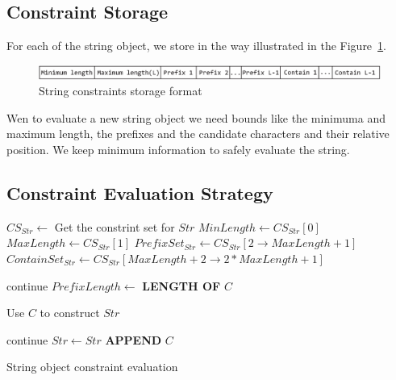 \subsection{Constraint Storage}
\label{subsec:constraintStorage}

For each of the string object, we store in the way illustrated in the
Figure~\ref{fig:constraint}.

\begin{figure}[htb]
\centering
\includegraphics[width=6.5in]{images/constraint.eps}
\caption{String constraints storage format}
\label{fig:constraint}
\end{figure}

Wen to evaluate a new string object we need bounds like the minimuma and maximum
length, the prefixes and the candidate characters and their relative position.
We keep minimum information to safely evaluate the string.

\subsection{Constraint Evaluation Strategy}
\label{subsec:constraintStorage}

\begin{algorithm}
\DontPrintSemicolon
{}
\Begin
{
 $CS_{Str} \leftarrow$ Get the constrint set for $Str$\;
 $MinLength \leftarrow CS_{Str}[0]$\;
 $MaxLength \leftarrow CS_{Str}[1]$\;
 $PrefixSet_{Str} \leftarrow CS_{Str}[2 \rightarrow MaxLength + 1]$\;
 $ContainSet_{Str} \leftarrow CS_{Str}[MaxLength +2  \rightarrow 2*MaxLength
 + 1]$\;
 
  {
   {
    continue\;
   }
   $PrefixLength \leftarrow$ {\bf LENGTH OF} $C$\;
   
   {
     Use $C$ to construct $Str$\;
   }
  }
 
  {
   {
    continue\;
   }
   $Str \leftarrow Str$ {\bf APPEND} $C$\;
  }
}
\caption{String object constraint evaluation}
 \label{algo:constraint}
\end{algorithm}


